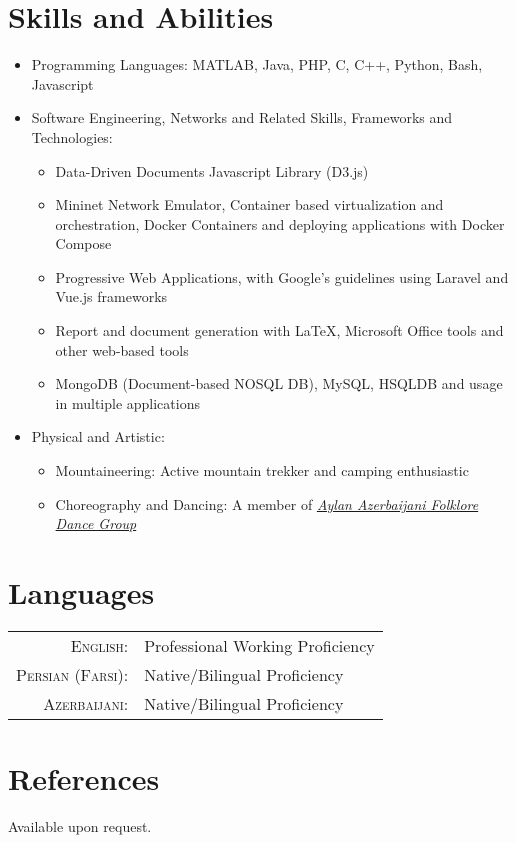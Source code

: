 \documentclass[a4paper,10pt]{article}
\begin{document}
\section{Skills and Abilities}
    \begin{itemize}
        \item Programming Languages: MATLAB, Java, PHP, C, C++, Python, Bash, Javascript
        \item Software Engineering, Networks and Related Skills, Frameworks and Technologies:
            \begin{itemize}
                \item Data-Driven Documents Javascript Library (D3.js)
                
                \item Mininet Network Emulator, Container based virtualization and orchestration, Docker Containers and deploying applications with Docker Compose
                
                \item Progressive Web Applications, with Google's guidelines using Laravel and Vue.js frameworks
                
                \item Report and document generation with \LaTeX{}, Microsoft Office tools and other web-based tools
                
                \item MongoDB (Document-based NOSQL DB), MySQL, HSQLDB and usage in multiple applications
                
            \end{itemize}
        
        \item Physical and Artistic:
            \begin{itemize}
                \item Mountaineering: Active mountain trekker and camping enthusiastic
                
                \item Choreography and Dancing: A member of \emph{\href{https://aylandance.com}{Aylan Azerbaijani Folklore Dance Group}}
            \end{itemize}
    \end{itemize}
    
\section{Languages}
\begin{tabular}{rl}
    \textsc{English:}&Professional Working Proficiency\\
    \textsc{Persian (Farsi):}&Native/Bilingual Proficiency\\
    \textsc{Azerbaijani:}&Native/Bilingual Proficiency\\
\end{tabular}

\section{References}
Available upon request.

\newpage

\end{document}
